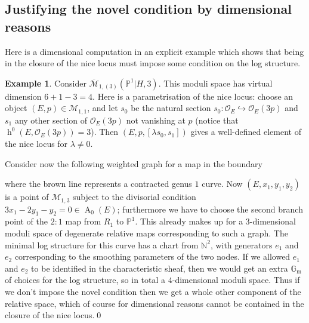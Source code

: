 \documentclass[11pt]{amsart}
\newcommand{\M}[4]{\overline{\mathcal{M}}_{#1,#2}(#3,#4)}
\newcommand{\PP}{\mathbb P}
\newcommand{\OO}{\mathcal{O}}
\newcommand{\Gm}{\mathbb{G}_{\text{m}}}
\newcommand{\Achow}{\operatorname{A}}
\newcommand{\h}{\operatorname{h}}
\theoremstyle{definition}
\theoremstyle{definition}
\newtheorem{example}[thm]{Example}
\begin{document}
\subsection{Justifying the novel condition by dimensional reasons}
Here is a dimensional computation in an explicit example which shows that being in the closure of the nice locus must impose some condition on the log structure.
\begin{example}
Consider $\M{1}{(3)}{\PP^1|H}{3}$. This moduli space has virtual dimension $6+1-3=4$. Here is a parametrisation of the nice locus: choose an object $(E,p) \in \mathcal{M}_{1,1}$, and let $s_0$ be the natural section $s_0 \colon\OO_E\hookrightarrow\OO_E(3p)$ and $s_1$ any other section of $\OO_E(3p)$ not vanishing at $p$ (notice that $\h^0(E,\OO_E(3p))=3$). Then $(E,p,[\lambda s_0,s_1])$ gives a well-defined element of the nice locus for $\lambda \neq 0$.

Consider now the following weighted graph for a map in the boundary
\begin{center}
\end{center}
where the brown line represents a contracted genus $1$ curve. Now $(E,x_1,y_1,y_2)$ is a point of $\mathcal{M}_{1,3}$ subject to the divisorial condition $3x_1-2y_1-y_2=0\in \Achow_0(E)$; furthermore we have to choose the second branch point of the $2:1$ map from $R_1$ to $\PP^1$. This already makes up for a $3$-dimensional moduli space of degenerate relative maps corresponding to such a graph. The minimal log structure for this curve has a chart from $\mathbb N^2$, with generators $e_1$ and $e_2$ corresponding to the smoothing parameters of the two nodes. If we allowed $e_1$ and $e_2$ to be identified in the characteristic sheaf, then we would get an extra $\Gm$ of choices for the log structure, so in total a $4$-dimensional moduli space. Thus if we don't impose the novel condition then we get a whole other component of the relative space, which of course for dimensional reasons cannot be contained in the closure of the nice locus.\qed
\end{example}
\end{document}
